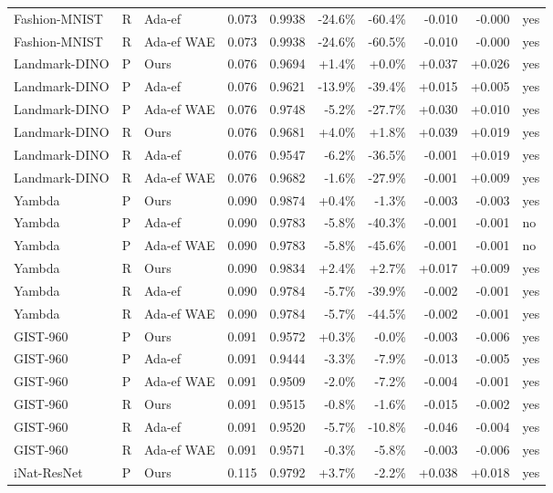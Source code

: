 \begin{tabular}{lllrrrrrrl}
Fashion-MNIST & R & Ada-ef & 0.073 & 0.9938 & -24.6\% & -60.4\% & -0.010 & -0.000 & yes \\
Fashion-MNIST & R & Ada-ef WAE & 0.073 & 0.9938 & -24.6\% & -60.5\% & -0.010 & -0.000 & yes \\
Landmark-DINO & P & Ours & 0.076 & 0.9694 & +1.4\% & +0.0\% & +0.037 & +0.026 & yes \\
Landmark-DINO & P & Ada-ef & 0.076 & 0.9621 & -13.9\% & -39.4\% & +0.015 & +0.005 & yes \\
Landmark-DINO & P & Ada-ef WAE & 0.076 & 0.9748 & -5.2\% & -27.7\% & +0.030 & +0.010 & yes \\
Landmark-DINO & R & Ours & 0.076 & 0.9681 & +4.0\% & +1.8\% & +0.039 & +0.019 & yes \\
Landmark-DINO & R & Ada-ef & 0.076 & 0.9547 & -6.2\% & -36.5\% & -0.001 & +0.019 & yes \\
Landmark-DINO & R & Ada-ef WAE & 0.076 & 0.9682 & -1.6\% & -27.9\% & -0.001 & +0.009 & yes \\
Yambda & P & Ours & 0.090 & 0.9874 & +0.4\% & -1.3\% & -0.003 & -0.003 & yes \\
Yambda & P & Ada-ef & 0.090 & 0.9783 & -5.8\% & -40.3\% & -0.001 & -0.001 & no \\
Yambda & P & Ada-ef WAE & 0.090 & 0.9783 & -5.8\% & -45.6\% & -0.001 & -0.001 & no \\
Yambda & R & Ours & 0.090 & 0.9834 & +2.4\% & +2.7\% & +0.017 & +0.009 & yes \\
Yambda & R & Ada-ef & 0.090 & 0.9784 & -5.7\% & -39.9\% & -0.002 & -0.001 & yes \\
Yambda & R & Ada-ef WAE & 0.090 & 0.9784 & -5.7\% & -44.5\% & -0.002 & -0.001 & yes \\
GIST-960 & P & Ours & 0.091 & 0.9572 & +0.3\% & -0.0\% & -0.003 & -0.006 & yes \\
GIST-960 & P & Ada-ef & 0.091 & 0.9444 & -3.3\% & -7.9\% & -0.013 & -0.005 & yes \\
GIST-960 & P & Ada-ef WAE & 0.091 & 0.9509 & -2.0\% & -7.2\% & -0.004 & -0.001 & yes \\
GIST-960 & R & Ours & 0.091 & 0.9515 & -0.8\% & -1.6\% & -0.015 & -0.002 & yes \\
GIST-960 & R & Ada-ef & 0.091 & 0.9520 & -5.7\% & -10.8\% & -0.046 & -0.004 & yes \\
GIST-960 & R & Ada-ef WAE & 0.091 & 0.9571 & -0.3\% & -5.8\% & -0.003 & -0.006 & yes \\
iNat-ResNet & P & Ours & 0.115 & 0.9792 & +3.7\% & -2.2\% & +0.038 & +0.018 & yes \\

\end{tabular}
